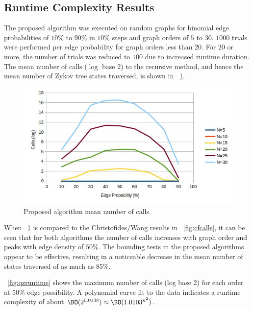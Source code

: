 \subsection{Runtime Complexity Results}\label{sec:sub:runtime}

The proposed algorithm was executed on random graphs for binomial edge probabilities of \(10\%\) to \(90\%\) in
\(10\%\) steps and graph orders of \(5\) to \(30\).  \(1000\) trials were performed per edge probability for graph
orders less than \(20\).  For \(20\) or more, the number of trials was reduced to \(100\) due to increased runtime
duration.  The mean number of calls (\(\log\) base \(2\)) to the recursive method, and hence the mean number of
Zykov tree states traversed, is shown in \figurename~\ref{fig:qzcalls}.

\begin{figure}[H]
  \centering
  \includegraphics[width=5in]{qz_calls}
  \caption{Proposed algorithm mean number of calls.}
  \label{fig:qzcalls}
\end{figure}

When \figurename~\ref{fig:qzcalls} is compared to the Christofides/Wang results in \figurename~\ref{fig:cfcalls},
it can be seen that for both algorithms the number of calls increases with graph order and peaks with edge density
of \(50\%\).  The bounding tests in the proposed algorithms appear to be effective, resulting in a noticeable
decrease in the mean number of states traversed of as much as \(85\%\).

\figurename~\ref{fig:qzruntime} shows the maximum number of calls (log base 2) for each order at \(50\%\) edge
possibility.  A polynomial curve fit to the data indicates a runtime complexity of about
\(\BO(2^{0.0148})\approx\BO(1.0103^{n^2})\).

